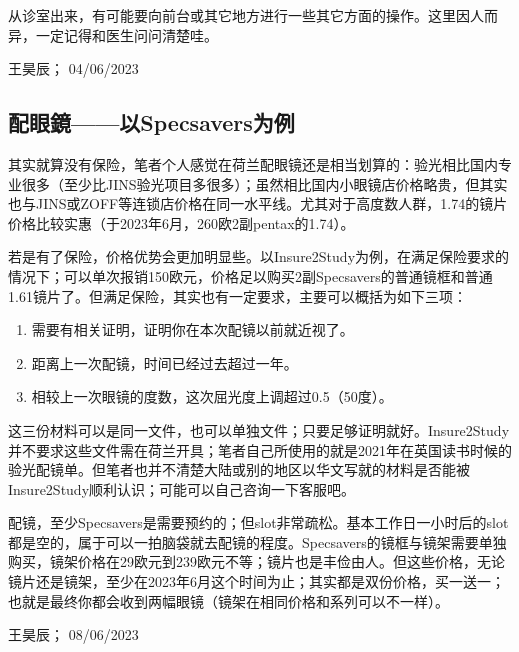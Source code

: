 从诊室出来，有可能要向前台或其它地方进行一些其它方面的操作。这里因人而异，一定记得和医生问问清楚哇。
\begin{flushright}
王昊辰； 04/06/2023
\end{flushright}

\subsection{配眼鏡——以Specsavers为例}
其实就算没有保险，笔者个人感觉在荷兰配眼镜还是相当划算的：验光相比国内专业很多（至少比JINS验光项目多很多）；虽然相比国内小眼镜店价格略贵，但其实也与JINS或ZOFF等连锁店价格在同一水平线。尤其对于高度数人群，1.74的镜片价格比较实惠（于2023年6月，260欧2副pentax的1.74）。

若是有了保险，价格优势会更加明显些。以Insure2Study为例，在满足保险要求的情况下；可以单次报销150欧元，价格足以购买2副Specsavers的普通镜框和普通1.61镜片了。但满足保险，其实也有一定要求，主要可以概括为如下三项：

\begin{enumerate}
\item 需要有相关证明，证明你在本次配镜以前就近视了。
\item 距离上一次配镜，时间已经过去超过一年。
\item 相较上一次眼镜的度数，这次屈光度上调超过0.5（50度）。
\end{enumerate}

这三份材料可以是同一文件，也可以单独文件；只要足够证明就好。Insure2Study并不要求这些文件需在荷兰开具；笔者自己所使用的就是2021年在英国读书时候的验光配镜单。但笔者也并不清楚大陆或别的地区以华文写就的材料是否能被Insure2Study顺利认识；可能可以自己咨询一下客服吧。

配镜，至少Specsavers是需要预约的；但slot非常疏松。基本工作日一小时后的slot都是空的，属于可以一拍脑袋就去配镜的程度。Specsavers的镜框与镜架需要单独购买，镜架价格在29欧元到239欧元不等；镜片也是丰俭由人。但这些价格，无论镜片还是镜架，至少在2023年6月这个时间为止；其实都是双份价格，买一送一；也就是最终你都会收到两幅眼镜（镜架在相同价格和系列可以不一样）。
\begin{flushright}
王昊辰； 08/06/2023
\end{flushright}


\vspace{\betsubsec} %
